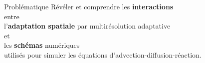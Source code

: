 \begin{frame}{Problématique}
    \centering
    \color{Primary}
        \Large Révéler et comprendre les \textbf{interactions}\\
        \normalsize entre\\
        \Large l'\textbf{adaptation spatiale} par multirésolution adaptative\\
        \normalsize et\\
        \Large les \textbf{schémas} numériques\\
        \normalsize utilisés pour simuler les équations d'advection-diffusion-réaction.
\end{frame}